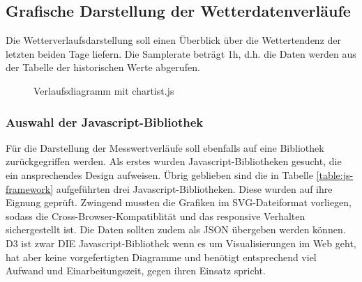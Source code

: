 \subsection{Grafische Darstellung der Wetterdatenverläufe}
Die Wetterverlaufsdarstellung soll einen Überblick über die Wettertendenz der letzten beiden Tage liefern. Die Samplerate beträgt 1h, d.h. die Daten werden aus der Tabelle der historischen Werte abgerufen.

\begin{figure}[h!]
	\centering
	\caption{Verlaufsdiagramm mit chartist.js}
	\label{img:charts}
\end{figure}



\subsubsection{Auswahl der Javascript-Bibliothek}
Für die Darstellung der Messwertverläufe soll ebenfalls auf eine Bibliothek zurückgegriffen werden. Als erstes wurden Javascript-Bibliotheken gesucht, die ein ansprechendes Design aufweisen. Übrig geblieben sind die in Tabelle \ref{table:js-framework} aufgeführten drei Javascript-Bibliotheken. Diese wurden auf ihre Eignung geprüft. Zwingend mussten die Grafiken im SVG-Dateiformat vorliegen, sodass die Cross-Browser-Kompatiblität und das responsive Verhalten sichergestellt ist. Die Daten sollten zudem als JSON übergeben werden können. D3 ist zwar DIE Javascript-Bibliothek wenn es um Visualisierungen im Web geht, hat aber keine vorgefertigten Diagramme und benötigt entsprechend viel Aufwand und Einarbeitungszeit, gegen ihren Einsatz spricht.

